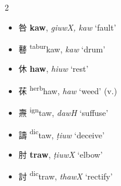 \begin{multicols}{2}
\raggedcolumns


\begin{itemize}

    \item {\Large{咎}} %
    {\large{\textbf{kaw}}},
    \textit{giuwX, kaw} `fault'         %

    \item {\Large{鼛}} %
    {\large{{\textsuperscript{tabur}}kaw}},
    \textit{kaw} `drum'        %

\end{itemize}

\medskip

\begin{itemize}

    \item {\Large{休}} %
    {\large{\textbf{haw}}},
    \textit{hiuw} `rest'        %

    \item {\Large{茠}} %
    {\large{{\textsuperscript{herb}}haw}},
    \textit{haw} `weed' (v.)      %

\end{itemize}

\medskip

\begin{itemize}
    \item {\Large{燾}} %
    {\large{{\textsuperscript{ign}}taw}},
    \textit{dawH} `suffuse'        %

    \item {\Large{譸}} %
    {\large{{\textsuperscript{dic}}taw}},
    \textit{ṭiuw} `deceive'        %

\end{itemize}

\medskip


\begin{itemize}

    \item {\Large{肘}} %
    {\large{\textbf{traw}}},
    \textit{ṭiuwX} `elbow'        %

    \item {\Large{討}} %
    {\large{{\textsuperscript{dic}}traw}},
    \textit{thawX} `rectify'        %


\end{itemize}
\end{multicols}
